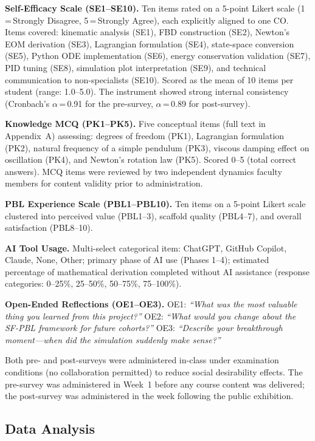 \documentclass[utf8]{FrontiersinHarvard}
\begin{document}
\textbf{Self-Efficacy Scale (SE1--SE10).} Ten items rated on a 5-point
Likert scale (1\,=\,Strongly Disagree, 5\,=\,Strongly Agree), each
explicitly aligned to one CO. Items covered: kinematic analysis (SE1),
FBD construction (SE2), Newton's EOM derivation (SE3), Lagrangian
formulation (SE4), state-space conversion (SE5), Python ODE implementation
(SE6), energy conservation validation (SE7), PID tuning (SE8), simulation
plot interpretation (SE9), and technical communication to non-specialists
(SE10). Scored as the mean of 10 items per student (range: 1.0--5.0).
The instrument showed strong internal consistency (Cronbach's
$\alpha$\,=\,0.91 for the pre-survey, $\alpha$\,=\,0.89 for post-survey).

\textbf{Knowledge MCQ (PK1--PK5).} Five conceptual items (full text in
Appendix~A) assessing: degrees of freedom (PK1), Lagrangian formulation
(PK2), natural frequency of a simple pendulum (PK3), viscous damping
effect on oscillation (PK4), and Newton's rotation law (PK5). Scored
0--5 (total correct answers). MCQ items were reviewed by two independent
dynamics faculty members for content validity prior to administration.

\textbf{PBL Experience Scale (PBL1--PBL10).} Ten items on a 5-point
Likert scale clustered into perceived value (PBL1--3), scaffold quality
(PBL4--7), and overall satisfaction (PBL8--10).

\textbf{AI Tool Usage.} Multi-select categorical item: ChatGPT, GitHub
Copilot, Claude, None, Other; primary phase of AI use (Phases 1--4);
estimated percentage of mathematical derivation completed without AI
assistance (response categories: 0--25\%, 25--50\%, 50--75\%, 75--100\%).

\textbf{Open-Ended Reflections (OE1--OE3).}
OE1: \textit{``What was the most valuable thing you learned from this
project?''} OE2: \textit{``What would you change about the SF-PBL framework
for future cohorts?''} OE3: \textit{``Describe your breakthrough moment---when
did the simulation suddenly make sense?''}

Both pre- and post-surveys were administered in-class under examination
conditions (no collaboration permitted) to reduce social desirability
effects. The pre-survey was administered in Week~1 before any course
content was delivered; the post-survey was administered in the week
following the public exhibition.

\subsection{Data Analysis}
\end{document}
